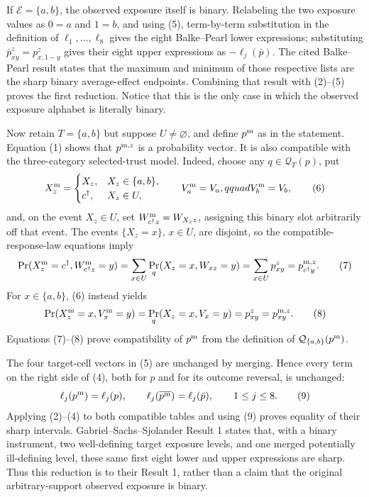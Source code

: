 If \(\mathcal E=\{a,b\}\), the observed exposure itself is binary.  Relabeling the two exposure values as \(0=a\) and \(1=b\), and using (5), term-by-term substitution in the definition of \(\ell_1,\ldots,\ell_8\) gives the eight Balke--Pearl lower expressions; substituting \(\bar p^z_{xy}=p^z_{x,1-y}\) gives their eight upper expressions as \(-\ell_j(\bar p)\).  The cited Balke--Pearl result states that the maximum and minimum of those respective lists are the sharp binary average-effect endpoints.  Combining that result with (2)--(5) proves the first reduction.  Notice that this is the only case in which the observed exposure alphabet is literally binary.

Now retain \(T=\{a,b\}\) but suppose \(U\neq\varnothing\), and define \(p^{\rm m}\) as in the statement.  Equation (1) shows that \(p^{{\rm m},z}\) is a probability vector.  It is also compatible with the three-category selected-trust model.  Indeed, choose any \(q\in\mathcal Q_T(p)\), put
\[
 X_z^{\rm m}=\begin{cases}
 X_z,&X_z\in\{a,b\},\\
 c^\dagger,&X_z\in U,
 \end{cases}
 \qquad V_a^{\rm m}=V_a,qquad V_b^{\rm m}=V_b,
 \tag{6}
\]
and, on the event \(X_z\in U\), set \(W^{\rm m}_{c^\dagger z}=W_{X_z z}\), assigning this binary slot arbitrarily off that event.  The events \(\{X_z=x\}\), \(x\in U\), are disjoint, so the compatible-response-law equations imply
\[
 \Pr(X_z^{\rm m}=c^\dagger,W^{\rm m}_{c^\dagger z}=y)
 =\sum_{x\in U}\Pr_q(X_z=x,W_{xz}=y)
 =\sum_{x\in U}p^z_{xy}
 =p^{{\rm m},z}_{c^\dagger y}.
 \tag{7}
\]
For \(x\in\{a,b\}\), (6) instead yields
\[
 \Pr(X_z^{\rm m}=x,V_x^{\rm m}=y)
 =\Pr_q(X_z=x,V_x=y)
 =p^z_{xy}
 =p^{{\rm m},z}_{xy}.
 \tag{8}
\]
Equations (7)--(8) prove compatibility of \(p^{\rm m}\) from the definition of \(\mathcal Q_{\{a,b\}}(p^{\rm m})\).

The four target-cell vectors in (5) are unchanged by merging.  Hence every term on the right side of (4), both for \(p\) and for its outcome reversal, is unchanged:
\[
 \ell_j(p^{\rm m})=\ell_j(p),
 \qquad
 \ell_j(\overline{p^{\rm m}})=\ell_j(\bar p),
 \qquad 1\leq j\leq8.
 \tag{9}
\]
Applying (2)--(4) to both compatible tables and using (9) proves equality of their sharp intervals.  Gabriel--Sachs--Sjolander Result 1 states that, with a binary instrument, two well-defining target exposure levels, and one merged potentially ill-defining level, these same first eight lower and upper expressions are sharp.  Thus this reduction is to their Result 1, rather than a claim that the original arbitrary-support observed exposure is binary.

